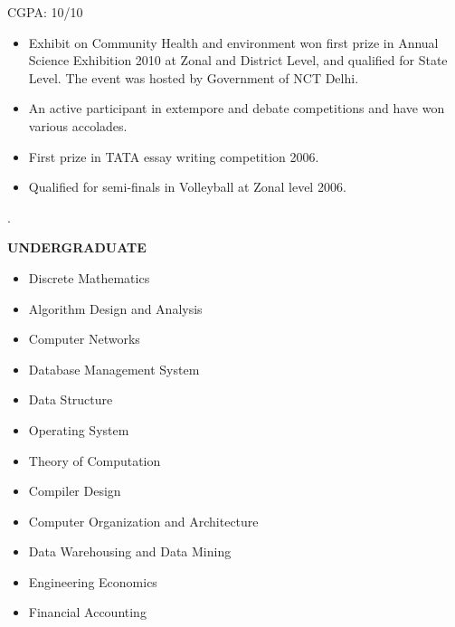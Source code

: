 CGPA: 10/10

\bigskip 


\begin{itemize}
    \item Exhibit on Community Health and environment won first prize in Annual Science Exhibition 2010 at Zonal and District Level, and qualified for State Level. The event was hosted by Government of NCT Delhi.
    \item An active participant in extempore and debate competitions and have won various accolades.
    \item First prize in TATA essay writing competition 2006.
    \item Qualified for semi-finals in Volleyball at Zonal level 2006. 
\end{itemize}.


\textbf{UNDERGRADUATE}

\medskip

\begin{itemize}
\item Discrete Mathematics
\item Algorithm Design and Analysis
\item Computer Networks
\item Database Management System
\item Data Structure
\item Operating System
\item Theory of Computation
\item Compiler Design
\item Computer Organization and Architecture
\item Data Warehousing and Data Mining 
\item Engineering Economics
\item Financial Accounting
\end{itemize}